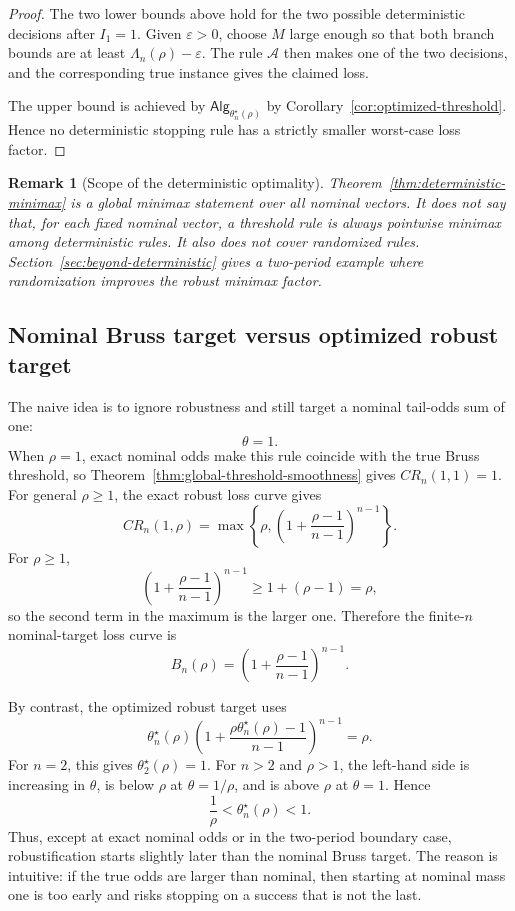 \documentclass[11pt,a4paper]{article}
\newtheorem{remark}{Remark}
\newcommand{\alg}{\mathsf{Alg}}
\begin{document}
\begin{proof}
The two lower bounds above hold for the two possible deterministic decisions
after \(I_1=1\).  Given \(\varepsilon>0\), choose \(M\) large enough so that both
branch bounds are at least \(\Lambda_n(\rho)-\varepsilon\).  The rule
\(\mathcal A\) then makes one of the two decisions, and the corresponding true
instance gives the claimed loss.

The upper bound is achieved by
\(\alg_{\theta_n^\star(\rho)}\) by Corollary~\ref{cor:optimized-threshold}.
Hence no deterministic stopping rule has a strictly smaller worst-case loss
factor.
\end{proof}

\begin{remark}[Scope of the deterministic optimality]
Theorem~\ref{thm:deterministic-minimax} is a global minimax statement over all
nominal vectors.  It does not say that, for each fixed nominal vector, a
threshold rule is always pointwise minimax among deterministic rules.  It also
does not cover randomized rules.  Section~\ref{sec:beyond-deterministic} gives a
two-period example where randomization improves the robust minimax factor.
\end{remark}

\subsection{Nominal Bruss target versus optimized robust target}

The naive idea is to ignore robustness and still target a nominal tail-odds
sum of one:
\[
  \theta=1.
\]
When \(\rho=1\), exact nominal odds make this rule coincide with the true Bruss
threshold, so Theorem~\ref{thm:global-threshold-smoothness} gives
\(CR_n(1,1)=1\).  For general \(\rho\ge1\), the exact robust loss curve gives
\[
  CR_n(1,\rho)
  =
  \max\left\{\rho,
  \left(1+\frac{\rho-1}{n-1}\right)^{n-1}\right\}.
\]
For \(\rho\ge1\),
\[
  \left(1+\frac{\rho-1}{n-1}\right)^{n-1}\ge 1+(\rho-1)=\rho,
\]
so the second term in the maximum is the larger one.  Therefore the finite-\(n\)
nominal-target loss curve is
\[
  \boxed{
  B_n(\rho)
  =
  \left(1+\frac{\rho-1}{n-1}\right)^{n-1}.
  }
  \tag{5}
\]

By contrast, the optimized robust target uses
\[
  \theta_n^\star(\rho)
  \left(1+\frac{\rho\theta_n^\star(\rho)-1}{n-1}\right)^{n-1}
  =
  \rho.
\]
For \(n=2\), this gives \(\theta_2^\star(\rho)=1\).  For \(n>2\) and
\(\rho>1\), the left-hand side is increasing in \(\theta\), is below \(\rho\) at
\(\theta=1/\rho\), and is above \(\rho\) at \(\theta=1\).  Hence
\[
  \frac1\rho<\theta_n^\star(\rho)<1.
\]
Thus, except at exact nominal odds or in the two-period boundary case,
robustification starts slightly later than the nominal Bruss target.  The
reason is intuitive: if the true odds are larger than nominal, then starting
at nominal mass one is too early and risks stopping on a success that is not
the last.
\end{document}
